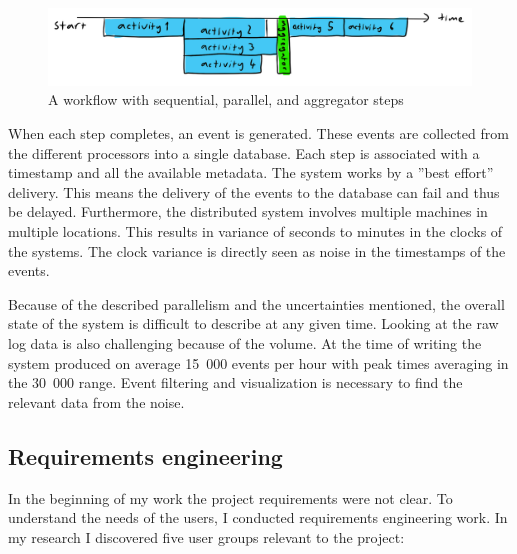 \begin{figure}[htb]
\centering \includegraphics[width=0.9\linewidth]{gfx/figures/workflow.png}
\caption{A workflow with sequential, parallel, and aggregator steps}
\label{fig:workflowexample}
\end{figure}

When each step completes, an event is generated.
These events are collected from the different processors into a single database.
Each step is associated with a timestamp and all the available metadata.
The system works by a ''best effort'' delivery. 
This means the delivery of the events to the database can fail and thus be delayed.
Furthermore, the distributed system involves multiple machines in multiple locations. 
This results in variance of seconds to minutes in the clocks of the systems.
The clock variance is directly seen as noise in the timestamps of the events.

Because of the described parallelism and the uncertainties mentioned, the overall state of the system is difficult to describe at any given time.
Looking at the raw log data is also challenging because of the volume.
At the time of writing the system produced on average 15~000 events per hour with peak times averaging in the 30~000 range.
Event filtering and visualization is necessary to find the relevant data from the noise.

\subsection{Requirements engineering}

In the beginning of my work the project requirements were not clear.
To understand the needs of the users, I conducted requirements engineering work.
In my research I discovered five user groups  relevant to the project:


